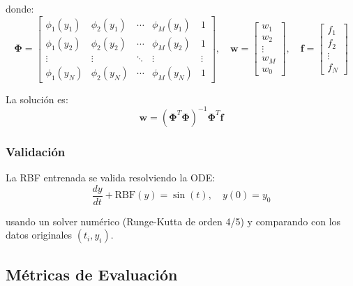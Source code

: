 \documentclass[11pt,a4paper]{article}
\begin{document}
donde:
\begin{equation}
\boldsymbol{\Phi} =
\begin{bmatrix}
\phi_1(y_1) & \phi_2(y_1) & \cdots & \phi_M(y_1) & 1 \\
\phi_1(y_2) & \phi_2(y_2) & \cdots & \phi_M(y_2) & 1 \\
\vdots & \vdots & \ddots & \vdots & \vdots \\
\phi_1(y_N) & \phi_2(y_N) & \cdots & \phi_M(y_N) & 1
\end{bmatrix}, \quad
\mathbf{w} =
\begin{bmatrix}
w_1 \\ w_2 \\ \vdots \\ w_M \\ w_0
\end{bmatrix}, \quad
\mathbf{f} =
\begin{bmatrix}
f_1 \\ f_2 \\ \vdots \\ f_N
\end{bmatrix}
\end{equation}

La solución es:
\begin{equation}
\mathbf{w} = (\boldsymbol{\Phi}^T \boldsymbol{\Phi})^{-1} \boldsymbol{\Phi}^T \mathbf{f}
\end{equation}

\subsubsection{Validación}

La RBF entrenada se valida resolviendo la ODE:
\begin{equation}
\frac{dy}{dt} + \text{RBF}(y) = \sin(t), \quad y(0) = y_0
\label{eq:ode_with_rbf}
\end{equation}

usando un solver numérico (Runge-Kutta de orden 4/5) y comparando con los datos originales $(t_i, y_i)$.

\subsection{Métricas de Evaluación}
\end{document}
